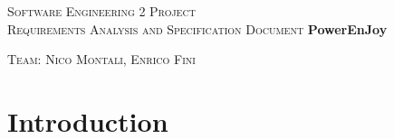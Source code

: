\documentclass[a4paper,12pt,oneside]{book}
\begin{document}
	
	\pagestyle{empty}\centering
	\textsc{\Large Software Engineering 2 Project\\}
	\textsc{Requirements Analysis and Specification Document}
	\vfill
	\textbf{\Huge PowerEnJoy}
	
	\vfill
	\textsc{\Large Team: Nico Montali, Enrico Fini}
	
	\tableofcontents

	\chapter{Introduction}\label{cap:Intro}
	
\end{document}
